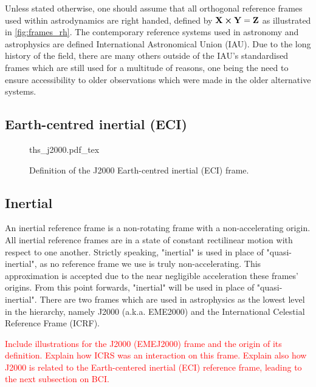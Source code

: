 Unless stated otherwise, one should assume that all orthogonal reference frames
used within astrodynamics are right handed, defined by
$\mathbf{X}\cross{\mathbf{Y}}=\mathbf{Z}$ as illustrated in
\autoref{fig:frames_rh}. The contemporary reference systems used in astronomy
and astrophysics are defined International Astronomical Union (IAU). Due to the
long history of the field, there are many others outside of the IAU's
standardised frames which are still used for a multitude of reasons, one being
the need to ensure accessibility to older observations which were made in the
older alternative systems.

\subsection{Earth-centred inertial (ECI)\label{ssec:frame_intertial}}

\begin{figure}[h]
    \centering
    \def\svgwidth{0.75\linewidth}
    {ths_j2000.pdf_tex}
    \caption{Definition of the J2000 Earth-centred inertial (ECI) frame.}
    \label{fig:my_label}
\end{figure}

\subsection{Inertial\label{ssec:frame_intertial}}

An inertial reference frame is a non-rotating frame with a non-accelerating
origin. All inertial reference frames are in a state of constant rectilinear
motion with respect to one another. Strictly speaking, "inertial" is used in
place of "quasi-inertial", as no reference frame we use is truly
non-accelerating. This approximation is accepted due to the near negligible
acceleration these frames' origins. From this point forwards, "inertial" will be
used in place of "quasi-inertial". There are two frames which are used in
astrophysics as the lowest level in the hierarchy, namely J2000 (a.k.a. EME2000)
and the International Celestial Reference Frame (ICRF).

\textcolor{red}{Include illustrations for the J2000 (EMEJ2000) frame and the
origin of its definition. Explain how ICRS was an interaction on this frame.
Explain also how J2000 is related to the Earth-centered inertial (ECI) reference
frame, leading to the next subsection on BCI.}

